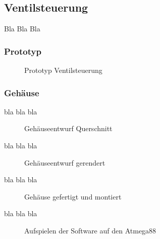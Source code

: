 \subsection{Ventilsteuerung}\label{Ventil}
Bla Bla Bla
\subsubsection{Prototyp}\label{VentilPr}
\begin{figure}[htb]
\centering
{}
\caption{Prototyp Ventilsteuerung}
\label{fig:PrV}
\end{figure}

\subsubsection{Gehäuse}\label{Gehaeuse}
bla bla bla
\begin{figure}[htb]
\centering
{}
\caption{Gehäuseentwurf Querschnitt}
\label{fig:Geh1}
\end{figure}

bla bla bla
\begin{figure}[htb]
\centering
{}
\caption{Gehäuseentwurf gerendert}
\label{fig:Geh2}
\end{figure}

bla bla bla
\begin{figure}[htb]
\centering
{}
\caption{Gehäuse gefertigt und montiert}
\label{fig:Geh3}
\end{figure}


bla bla bla
\begin{figure}[htb]
\centering
{}
\caption{Aufspielen der Software auf den Atmega88}
\label{fig:Flashing}
\end{figure}
